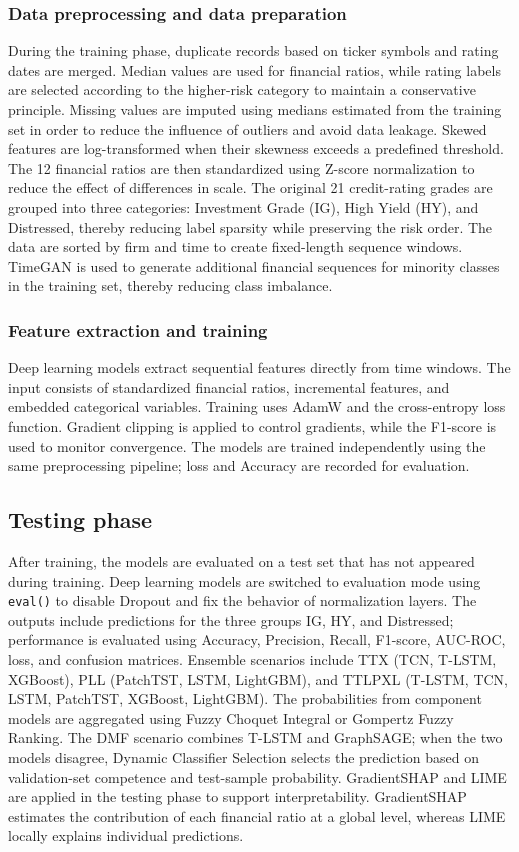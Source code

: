 \documentclass[10pt,twoside]{article}
\begin{document}
\subsubsection{Data preprocessing and data preparation}
During the training phase, duplicate records based on ticker symbols and rating dates are merged. Median values are used for financial ratios, while rating labels are selected according to the higher-risk category to maintain a conservative principle. Missing values are imputed using medians estimated from the training set in order to reduce the influence of outliers and avoid data leakage. Skewed features are log-transformed when their skewness exceeds a predefined threshold. The 12 financial ratios are then standardized using Z-score normalization to reduce the effect of differences in scale. The original 21 credit-rating grades are grouped into three categories: Investment Grade (IG), High Yield (HY), and Distressed, thereby reducing label sparsity while preserving the risk order. The data are sorted by firm and time to create fixed-length sequence windows. TimeGAN is used to generate additional financial sequences for minority classes in the training set, thereby reducing class imbalance.

\subsubsection{Feature extraction and training}
Deep learning models extract sequential features directly from time windows. The input consists of standardized financial ratios, incremental features, and embedded categorical variables. Training uses AdamW and the cross-entropy loss function. Gradient clipping is applied to control gradients, while the F1-score is used to monitor convergence. The models are trained independently using the same preprocessing pipeline; loss and Accuracy are recorded for evaluation.

\subsection{Testing phase}
After training, the models are evaluated on a test set that has not appeared during training. Deep learning models are switched to evaluation mode using \texttt{eval()} to disable Dropout and fix the behavior of normalization layers. The outputs include predictions for the three groups IG, HY, and Distressed; performance is evaluated using Accuracy, Precision, Recall, F1-score, AUC-ROC, loss, and confusion matrices. Ensemble scenarios include TTX (TCN, T-LSTM, XGBoost), PLL (PatchTST, LSTM, LightGBM), and TTLPXL (T-LSTM, TCN, LSTM, PatchTST, XGBoost, LightGBM). The probabilities from component models are aggregated using Fuzzy Choquet Integral or Gompertz Fuzzy Ranking. The DMF scenario combines T-LSTM and GraphSAGE; when the two models disagree, Dynamic Classifier Selection selects the prediction based on validation-set competence and test-sample probability. GradientSHAP and LIME are applied in the testing phase to support interpretability. GradientSHAP estimates the contribution of each financial ratio at a global level, whereas LIME locally explains individual predictions.
\end{document}
